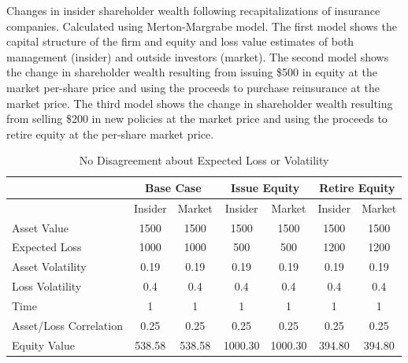 \begin{table}\caption{No Disagreement about Expected Loss or Volatility\label{tab:base}}
\begin{small}Changes in insider shareholder wealth following recapitalizations of insurance companies.  Calculated using Merton-Margrabe model.  The first model shows the capital structure of the firm and equity and loss value estimates of both management (insider) and outside investors (market).  The second model shows the change in shareholder wealth resulting from issuing \$500 in equity at the market per-share price and using the proceeds to purchase reinsurance at the market price.  The third model shows the change in shareholder wealth resulting from selling \$200 in new policies at the market price and using the proceeds to retire equity at the per-share market price.\end{small}
\begin{center}
\begin{tabular}{p{2in}cccccc}
\toprule
           & \multicolumn{ 2}{c}{Base Case} & \multicolumn{ 2}{c}{Issue Equity} & \multicolumn{ 2}{c}{Retire Equity} \\
\midrule
           &  Insider &     Market &  Insider &     Market &  Insider &     Market \\
\midrule
\midrule
Asset Value &       1500 &       1500 &       1500 &       1500 &       1500 &       1500 \\

Expected Loss &       1000 &       1000 &        500 &        500 &       1200 &       1200 \\

Asset Volatility &       0.19 &       0.19 &       0.19 &       0.19 &       0.19 &       0.19 \\

Loss Volatility &        0.4 &        0.4 &        0.4 &        0.4 &        0.4 &        0.4 \\

      Time &          1 &          1 &          1 &          1 &          1 &          1 \\

Asset/Loss Correlation &       0.25 &       0.25 &       0.25 &       0.25 &       0.25 &       0.25 \\

\midrule
Equity Value & 538.58 &   538.58 &   1000.30 &   1000.30 &    394.80 &    394.80 \\


\end{tabular}
\end{center}
\end{table}
